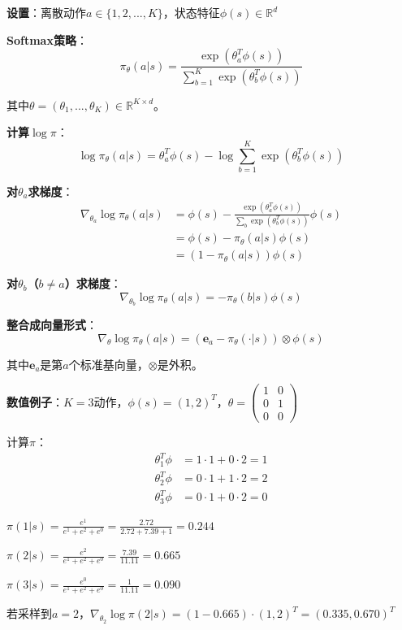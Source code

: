 \documentclass[11pt,a4paper]{article}
\theoremstyle{definition}
\begin{document}
\begin{calculation}[Softmax策略的梯度]
\textbf{设置}：离散动作$a \in \{1, 2, ..., K\}$，状态特征$\phi(s) \in \mathbb{R}^d$

\textbf{Softmax策略}：
\[
\pi_\theta(a|s) = \frac{\exp(\theta_a^T \phi(s))}{\sum_{b=1}^K \exp(\theta_b^T \phi(s))}
\]

其中$\theta = (\theta_1, ..., \theta_K) \in \mathbb{R}^{K \times d}$。

\textbf{计算$\log \pi$}：
\[
\log \pi_\theta(a|s) = \theta_a^T \phi(s) - \log \sum_{b=1}^K \exp(\theta_b^T \phi(s))
\]

\textbf{对$\theta_a$求梯度}：
\begin{align*}
\nabla_{\theta_a} \log \pi_\theta(a|s) &= \phi(s) - \frac{\exp(\theta_a^T \phi(s))}{\sum_b \exp(\theta_b^T \phi(s))} \phi(s) \\
&= \phi(s) - \pi_\theta(a|s) \phi(s) \\
&= (1 - \pi_\theta(a|s)) \phi(s)
\end{align*}

\textbf{对$\theta_b$（$b \neq a$）求梯度}：
\[
\nabla_{\theta_b} \log \pi_\theta(a|s) = -\pi_\theta(b|s) \phi(s)
\]

\textbf{整合成向量形式}：
\[
\nabla_\theta \log \pi_\theta(a|s) = (\mathbf{e}_a - \pi_\theta(\cdot|s)) \otimes \phi(s)
\]

其中$\mathbf{e}_a$是第$a$个标准基向量，$\otimes$是外积。

\textbf{数值例子}：$K=3$动作，$\phi(s) = (1, 2)^T$，$\theta = \begin{pmatrix} 1 & 0 \\ 0 & 1 \\ 0 & 0 \end{pmatrix}$

计算$\pi$：
\begin{align*}
\theta_1^T \phi &= 1 \cdot 1 + 0 \cdot 2 = 1 \\
\theta_2^T \phi &= 0 \cdot 1 + 1 \cdot 2 = 2 \\
\theta_3^T \phi &= 0 \cdot 1 + 0 \cdot 2 = 0
\end{align*}

$\pi(1|s) = \frac{e^1}{e^1 + e^2 + e^0} = \frac{2.72}{2.72 + 7.39 + 1} = 0.244$

$\pi(2|s) = \frac{e^2}{e^1 + e^2 + e^0} = \frac{7.39}{11.11} = 0.665$

$\pi(3|s) = \frac{e^0}{e^1 + e^2 + e^0} = \frac{1}{11.11} = 0.090$

若采样到$a=2$，$\nabla_{\theta_2} \log \pi(2|s) = (1 - 0.665) \cdot (1, 2)^T = (0.335, 0.670)^T$
\end{calculation}
\end{document}
